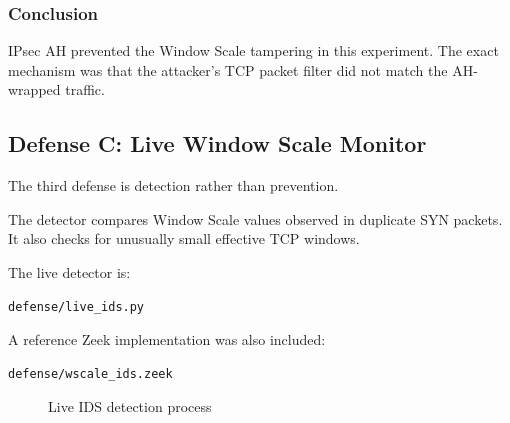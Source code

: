 \documentclass[11pt]{article}
\begin{document}
\subsubsection*{Conclusion}

IPsec AH prevented the Window Scale tampering in this experiment.
The exact mechanism was that the attacker's TCP packet filter did not
match the AH-wrapped traffic.

\subsection{Defense C: Live Window Scale Monitor}

The third defense is detection rather than prevention.

The detector compares Window Scale values observed in duplicate SYN
packets. It also checks for unusually small effective TCP windows.

The live detector is:

\begin{lstlisting}
defense/live_ids.py
\end{lstlisting}

A reference Zeek implementation was also included:

\begin{lstlisting}
defense/wscale_ids.zeek
\end{lstlisting}

\begin{figure}[h]
\centering
{}
\caption{Live IDS detection process}
\end{figure}
\end{document}
